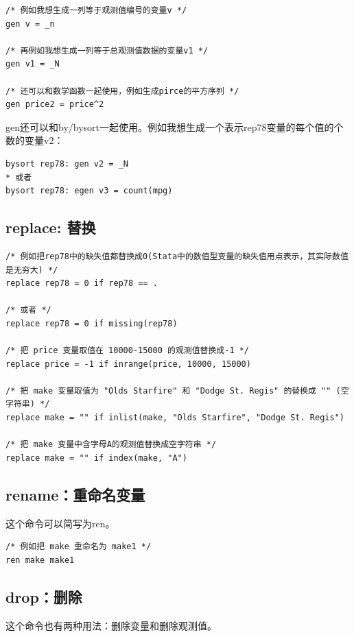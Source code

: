 \begin{lstlisting}
/* 例如我想生成一列等于观测值编号的变量v */
gen v = _n

/* 再例如我想生成一列等于总观测值数据的变量v1 */
gen v1 = _N

/* 还可以和数学函数一起使用，例如生成pirce的平方序列 */
gen price2 = price^2
\end{lstlisting}

gen还可以和by/bysort一起使用。例如我想生成一个表示rep78变量的每个值的个数的变量v2：

\begin{lstlisting}
bysort rep78: gen v2 = _N
* 或者
bysort rep78: egen v3 = count(mpg)
\end{lstlisting}

\subsection{replace: 替换}

\begin{lstlisting}
/* 例如把rep78中的缺失值都替换成0(Stata中的数值型变量的缺失值用点表示，其实际数值是无穷大) */
replace rep78 = 0 if rep78 == .

/* 或者 */
replace rep78 = 0 if missing(rep78)

/* 把 price 变量取值在 10000-15000 的观测值替换成-1 */
replace price = -1 if inrange(price, 10000, 15000)

/* 把 make 变量取值为 "Olds Starfire" 和 "Dodge St. Regis" 的替换成 "" (空字符串) */
replace make = "" if inlist(make, "Olds Starfire", "Dodge St. Regis")

/* 把 make 变量中含字母A的观测值替换成空字符串 */
replace make = "" if index(make, "A")
\end{lstlisting}

\subsection{rename：重命名变量}

这个命令可以简写为ren。

\begin{lstlisting}
/* 例如把 make 重命名为 make1 */
ren make make1
\end{lstlisting}

\subsection{drop：删除}

这个命令也有两种用法：删除变量和删除观测值。

